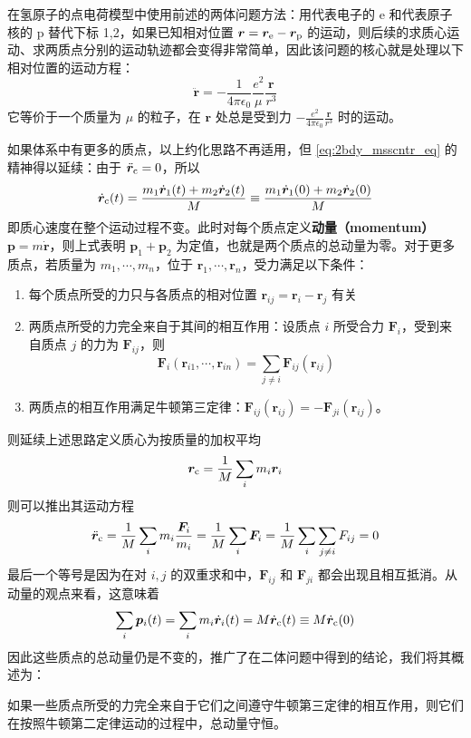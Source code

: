 \documentclass[cn,10pt,math=newtx,citestyle=gb7714-2015,bibstyle=gb7714-2015]{elegantbook}
\def\bm{\boldsymbol}
\begin{document}
\begin{instance}[氢原子双点电荷模型的约化]
    在氢原子的点电荷模型中使用前述的两体问题方法：用代表电子的 e 和代表原子核的 p 替代下标 1,2，如果已知相对位置 $\bm r=\bm r_\text e-\bm r_\text p$ 的运动，则后续的求质心运动、求两质点分别的运动轨迹都会变得非常简单，因此该问题的核心就是处理以下相对位置的运动方程：
    \begin{equation*}
        \ddot{\bm r} = -\frac{1}{4\pi\epsilon_0}\frac{e^2}{\mu}\frac{\bm r}{r^3}
    \end{equation*}
    它等价于一个质量为 $\mu$ 的粒子，在 $\bm r$ 处总是受到力 $-\frac{e^2}{4\pi\epsilon_0}\frac{\bm r}{r^3}$ 时的运动。
\end{instance}

如果体系中有更多的质点，以上约化思路不再适用，但 \ref{eq:2bdy_msscntr_eq} 的精神得以延续：由于 $\ddot{\bm r}_\text c=0$，所以
\begin{equation*}
    \dot{\bm r}_\text c(t)=\frac{m_1\dot{\bm r}_1(t)+m_2\dot {\bm r}_2(t)}{M}\equiv\frac{m_1\dot{\bm r}_1(0)+m_2\dot {\bm r}_2(0)}{M}
\end{equation*}
即质心速度在整个运动过程不变。此时对每个质点定义\textbf{动量（momentum）} $\bm p=m\dot{\bm r}$，则上式表明 $\bm p_1+\bm p_2$ 为定值，也就是两个质点的总动量为零。对于更多质点，若质量为 $m_1,\cdots,m_n$，位于 $\bm r_1,\cdots,\bm r_n$，受力满足以下条件：
\begin{enumerate}
    \item 每个质点所受的力只与各质点的相对位置 $\bm r_{ij}=\bm r_i-\bm r_j$ 有关
    \item 两质点所受的力完全来自于其间的相互作用：设质点 $i$ 所受合力 $\bm F_i$，受到来自质点 $j$ 的力为 $\bm F_{ij}$，则
    \begin{equation*}
        \bm F_i(\bm r_{i1},\cdots,\bm r_{in}) = \sum_{j\ne i}\bm F_{ij}(\bm r_{ij})
    \end{equation*}
    \item 两质点的相互作用满足牛顿第三定律：$\bm F_{ij}(\bm r_{ij}) = -\bm F_{ji}(\bm r_{ij})$。
\end{enumerate}
则延续上述思路定义质心为按质量的加权平均
\begin{equation*}
    \bm r_\text c=\frac{1}{M}\sum_i m_i\bm r_i
\end{equation*}
则可以推出其运动方程
\begin{equation*}
    \ddot{\bm r}_\text c=\frac{1}{M}\sum_i m_i\frac{\bm F_i}{m_i} = \frac{1}{M}\sum_i\bm F_i = \frac{1}{M}\sum_i\sum_{j\ne i}F_{ij}=0
\end{equation*}
最后一个等号是因为在对 $i,j$ 的双重求和中，$\bm F_{ij}$ 和 $\bm F_{ji}$ 都会出现且相互抵消。从动量的观点来看，这意味着
\begin{equation*}
    \sum_{i}\bm p_i(t) = \sum_i m_i\dot{\bm r}_i(t)=M\dot{\bm r}_\text c(t)\equiv M\dot{\bm r}_\text c(0)
\end{equation*}
因此这些质点的总动量仍是不变的，推广了在二体问题中得到的结论，我们将其概述为：
\begin{theorem}[动量守恒定律（v1.0）]
    如果一些质点所受的力完全来自于它们之间遵守牛顿第三定律的相互作用，则它们在按照牛顿第二定律运动的过程中，总动量守恒。
\end{theorem}
\end{document}
